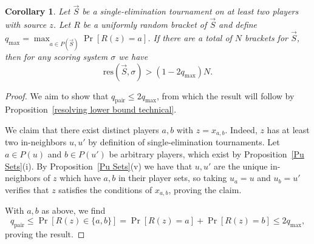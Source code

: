 \documentclass[12pt,letterpaper]{article}
\newtheorem{cor}[thm]{Corollary}
\theoremstyle{definition}
\newcommand{\sig}{\sigma}
\renewcommand{\1}{\mathbbm{1}}
\newcommand{\tour}{\vec{S}}
\newcommand{\res}{\mathrm{res}}
\begin{document}
\begin{cor}\label{resolving qpair and qmax}
	Let $\tour$ be a single-elimination tournament on at least two players with source $z$.  Let $R$ be a uniformly random bracket of $\tour$ and define $q_{\max}=\max_{a\in P(\tour)}\Pr[R(z)=a]$.
	If there are a total of $N$ brackets for $\tour$, then for any scoring system $\sig$ we have
	\[\res(\tour,\sig)>(1-2q_{\max})N.\]
\end{cor}
\begin{proof}
	We aim to show that $q_{\mathrm{pair}}\le 2q_{\max}$, from which the result will follow by Proposition~\ref{resolving lower bound technical}.  
	
	We claim that there exist distinct players $a,b$ with  $z=x_{a,b}$.  Indeed, $z$ has at least two in-neighbors $u,u'$ by definition of single-elimination tournaments.  Let $a\in P(u)$ and $b\in P(u')$ be arbitrary players, which exist by Proposition~\ref{Pu Sets}(i). By Proposition~\ref{Pu Sets}(v) we have that $u,u'$ are the unique in-neighbors of $z$ which have $a,b$ in their player sets, so taking $u_a=u$ and $u_b=u'$ verifies that $z$ satisfies the conditions of $x_{a,b}$, proving the claim.
	
	With $a,b$ as above, we find
	\[q_{\mathrm{pair}}\le \Pr[R(z)\in \{a,b\}]= \Pr[R(z)=a]+\Pr[R(z)=b]\le 2 q_{\max},\]
	proving the result.
\end{proof}
\end{document}
